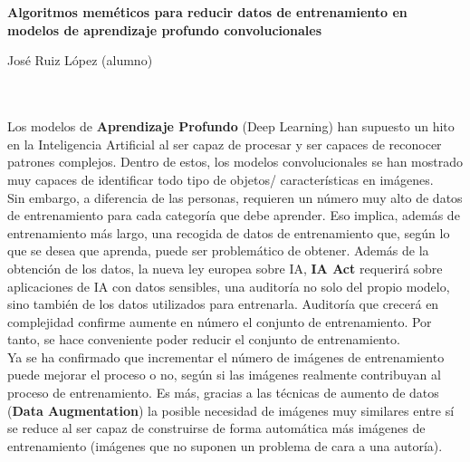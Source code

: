 \chapter*{}



\cleardoublepage
\thispagestyle{empty}

\begin{center}
{\large\bfseries Algoritmos meméticos para reducir datos de entrenamiento en modelos de aprendizaje profundo
convolucionales}\\
\end{center}
\begin{center}
José Ruiz López (alumno)\\
\end{center}

\\

\vspace{0.7cm}
\\

Los modelos de \textbf{Aprendizaje Profundo} (Deep Learning) han supuesto un hito en la Inteligencia Artificial al ser
capaz de procesar y ser capaces de reconocer patrones complejos.
Dentro de estos, los modelos convolucionales se han mostrado muy capaces de identificar todo tipo de objetos/
características en imágenes.\\[6pt]

Sin embargo, a diferencia de las personas, requieren un número muy alto de datos de entrenamiento para cada categoría
que debe aprender.
Eso implica, además de entrenamiento más largo, una recogida de datos de entrenamiento que, según lo que se desea que
aprenda, puede ser problemático de obtener.
Además de la obtención de los datos, la nueva ley europea sobre IA, \textbf{IA Act} requerirá sobre aplicaciones de IA
con datos sensibles, una auditoría no solo del propio modelo, sino también de los datos utilizados para entrenarla.
Auditoría que crecerá en complejidad confirme aumente en número el conjunto de entrenamiento.
Por tanto, se hace conveniente poder reducir el conjunto de entrenamiento.\\[6pt]

Ya se ha confirmado que incrementar el número de imágenes de entrenamiento puede mejorar el proceso o no, según si las
imágenes realmente contribuyan al proceso de entrenamiento.
Es más, gracias a las técnicas de aumento de datos (\textbf{Data Augmentation}) la posible necesidad de imágenes muy
similares entre sí se reduce al ser capaz de construirse de forma automática más imágenes de entrenamiento (imágenes
que no suponen un problema de cara a una autoría).\\[6pt]

